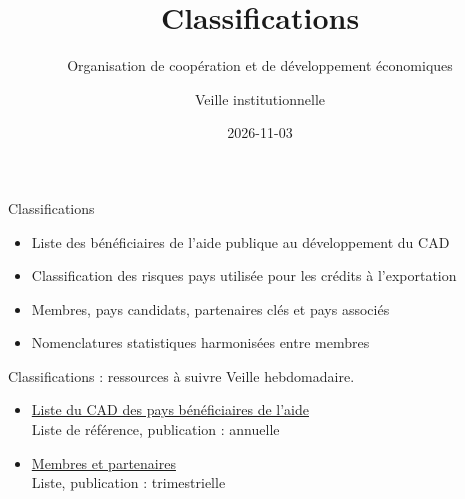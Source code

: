 \documentclass[aspectratio=169,11pt]{beamer}
\title{Classifications}
\subtitle{Organisation de coopération et de développement économiques}
\author{Veille institutionnelle}
\date{2026-11-03}
\begin{document}
\begin{frame}\titlepage\end{frame}

\begin{frame}{Classifications}
\begin{itemize}
\item Liste des bénéficiaires de l'aide publique au développement du CAD
\item Classification des risques pays utilisée pour les crédits à l'exportation
\item Membres, pays candidats, partenaires clés et pays associés
\item Nomenclatures statistiques harmonisées entre membres
\end{itemize}
\end{frame}

\begin{frame}{Classifications : ressources à suivre}
\small
Veille hebdomadaire.
\begin{itemize}
\item \href{https://www.oecd.org/en/topics/sub-issues/oda-eligibility-and-conditions/dac-list-of-oda-recipients.html}{Liste du CAD des pays bénéficiaires de l'aide}\\{\footnotesize Liste de référence, publication : annuelle}
\item \href{https://www.oecd.org/en/about/members-partners.html}{Membres et partenaires}\\{\footnotesize Liste, publication : trimestrielle}
\end{itemize}
\end{frame}
\end{document}
